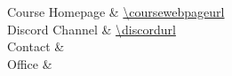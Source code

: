 Course Homepage 							& \url{\coursewebpageurl} \\
Discord Channel								& \url{\discordurl} \\
Contact 										& \professorcontactinfo  \\
Office 										& \professoroffice  \\